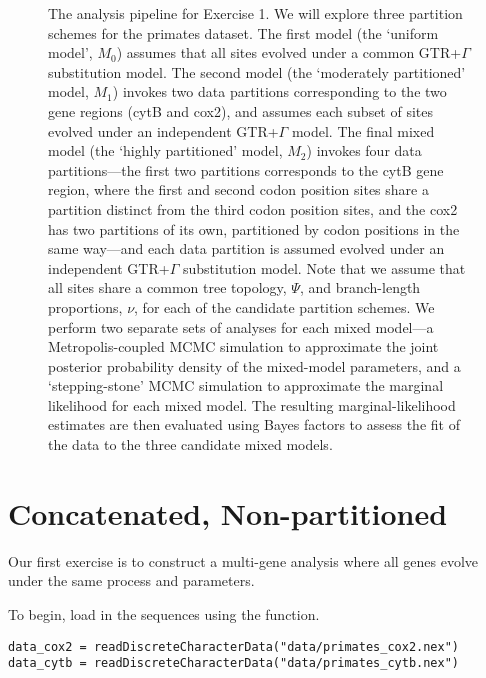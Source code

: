 \begin{figure}[ht!]
\centering
{}
\caption{\small The analysis pipeline for Exercise 1. We will explore three partition schemes for the primates dataset.
The first model (the `uniform model', $M_0$) assumes that all sites evolved under a common GTR+$\Gamma$ substitution model.
The second model (the `moderately partitioned' model, $M_1$) invokes two data partitions corresponding to the two gene regions (cytB and cox2), and assumes each subset of sites evolved under an independent GTR+$\Gamma$ model.
The final mixed model (the `highly partitioned' model, $M_2$) invokes four data partitions---the first two partitions corresponds to the cytB gene region, where the first and second codon position sites share a partition distinct from the third codon position sites, and the cox2 has two partitions of its own, partitioned by codon positions in the same way---and each data partition is assumed evolved under an independent GTR+$\Gamma$ substitution model.
Note that we assume that all sites share a common tree topology, $\Psi$, and branch-length proportions, $\nu$, for each of the candidate partition schemes.
We perform two separate sets of analyses for each mixed model---a Metropolis-coupled MCMC simulation to approximate the joint posterior probability density of the mixed-model parameters, and a `stepping-stone' MCMC simulation to approximate the marginal likelihood for each mixed model.
The resulting marginal-likelihood estimates are then evaluated using Bayes factors to assess the fit of the data to the three candidate mixed models.  
}
\label{pipeline}
\end{figure}
\newpage



\section{Concatenated, Non-partitioned}\label{secUnif} 

Our first exercise is to construct a multi-gene analysis where all genes evolve under the same process and parameters.

To begin, load in the sequences using the  function. 
{\tt \begin{snugshade*}
\begin{lstlisting}
data_cox2 = readDiscreteCharacterData("data/primates_cox2.nex")
data_cytb = readDiscreteCharacterData("data/primates_cytb.nex")
\end{lstlisting}
\end{snugshade*}}


